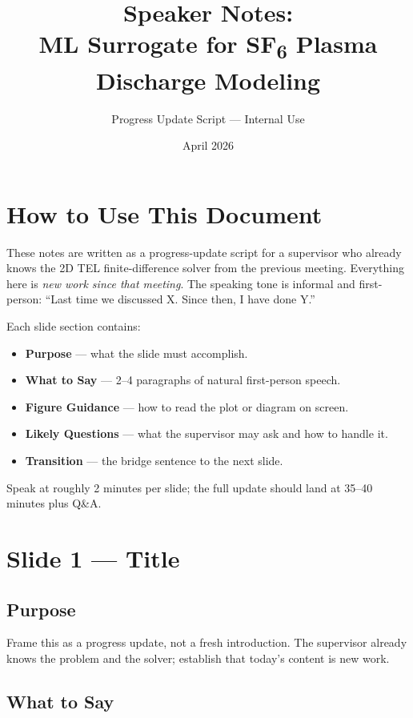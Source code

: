 \documentclass[12pt,a4paper]{article}
\title{Speaker Notes:\\
  ML Surrogate for SF\textsubscript{6} Plasma Discharge Modeling}
\author{Progress Update Script --- Internal Use}
\date{April 2026}
\begin{document}
\maketitle
\tableofcontents
\clearpage

\section*{How to Use This Document}

These notes are written as a progress-update script for a supervisor
who already knows the 2D TEL finite-difference solver from the
previous meeting. Everything here is \emph{new work since that
meeting}. The speaking tone is informal and first-person: ``Last time
we discussed X. Since then, I have done Y.''

Each slide section contains:
\begin{itemize}
  \item \textbf{Purpose} --- what the slide must accomplish.
  \item \textbf{What to Say} --- 2--4 paragraphs of natural first-person speech.
  \item \textbf{Figure Guidance} --- how to read the plot or diagram on screen.
  \item \textbf{Likely Questions} --- what the supervisor may ask and how to handle it.
  \item \textbf{Transition} --- the bridge sentence to the next slide.
\end{itemize}

Speak at roughly 2 minutes per slide; the full update should land at
35--40 minutes plus Q\&A.

\clearpage

\section{Slide 1 --- Title}
\label{sec:slide1}

\subsection*{Purpose}
Frame this as a progress update, not a fresh introduction.
The supervisor already knows the problem and the solver; establish
that today's content is new work.

\subsection*{What to Say}
\end{document}

